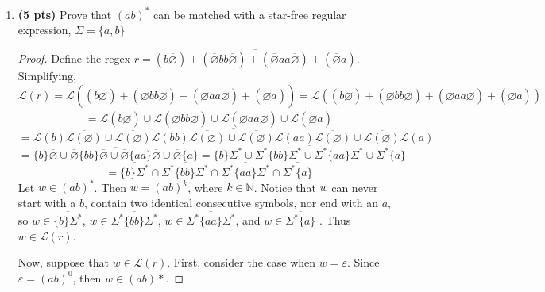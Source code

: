 \documentclass[11pt]{article}
\begin{document}
\begin{enumerate}[label=\textbf{Q\arabic*.}]
\begin{enumerate}[label=\textit{\alph*)}]
	\item \textbf{(5 pts)} Prove that $(ab)^*$ can be matched with a star-free regular expression, $\Sigma = \{a,b\}$
	
	\begin{proof}
		Define the regex \(r = \overline{(b\overline{\varnothing}) + (\overline{\varnothing}bb\overline{\varnothing}) + (\overline{\varnothing}aa\overline{\varnothing}) + (\overline{\varnothing}a)}\). Simplifying,
		\[
			\mathcal{L} (r) = \mathcal{L} \left(\overline{(b\overline{\varnothing}) + (\overline{\varnothing}bb\overline{\varnothing}) + (\overline{\varnothing}aa\overline{\varnothing}) + (\overline{\varnothing}a)}\right) = \overline{\mathcal{L}((b\overline{\varnothing}) + (\overline{\varnothing}bb\overline{\varnothing}) + (\overline{\varnothing}aa\overline{\varnothing}) + (\overline{\varnothing}a))}
		\]
		\[
			= \overline{\mathcal{L} (b\overline{\varnothing}) \cup \mathcal{L} (\overline{\varnothing}bb\overline{\varnothing}) \cup \mathcal{L} (\overline{\varnothing}aa\overline{\varnothing}) \cup \mathcal{L} (\overline{\varnothing}a)}
		\]
		\[
			= \overline{\mathcal{L} (b) \overline{\mathcal{L} (\varnothing)} \cup \overline{\mathcal{L} (\varnothing)} \mathcal{L} (bb) \overline{\mathcal{L} (\varnothing)} \cup \overline{\mathcal{L} (\varnothing)} \mathcal{L} (aa) \overline{\mathcal{L} (\varnothing)} \cup \overline{\mathcal{L} (\varnothing)}\mathcal{L} (a)}
		\]
		\[
			= \overline{\{b\} \overline{\varnothing} \cup \overline{\varnothing} \{bb\} \overline{\varnothing} \cup \overline{\varnothing} \{aa\} \overline{\varnothing} \cup \overline{\varnothing}\{a\}} = \overline{\{b\} \Sigma ^* \cup \Sigma ^* \{bb\} \Sigma ^* \cup \Sigma ^* \{aa\} \Sigma ^* \cup \Sigma ^* \{a\}}
		\]
		\[
			= \overline{\{b\}\Sigma ^*} \cap \overline{\Sigma ^* \{bb\}\Sigma ^*} \cap \overline{\Sigma ^* \{aa\} \Sigma ^*} \cap \overline{\Sigma ^* \{a\}}
		\]
		Let \(w \in (ab)^*\). Then \(w = (ab)^k\), where \(k \in \mathbb{N}\). Notice that \(w\) can never start with a \(b\), contain two identical consecutive symbols, nor end with an \(a\), so \(w \in \overline{\{b\}\Sigma ^*}\), \(w \in \overline{\Sigma ^* \{bb\}\Sigma ^*}\), \(w \in \overline{\Sigma ^* \{aa\} \Sigma ^*}\), and \(w \in \overline{\Sigma ^* \{a\}}\) . Thus \(w \in \mathcal{L} (r)\).

		Now, suppose that \(w \in \mathcal{L} (r)\). First, consider the case when \(w = \varepsilon\). Since \(\varepsilon = (ab)^0\), then \(w \in (ab)*\).
		

\end{proof}
\end{enumerate}
\end{enumerate}
\end{document}
